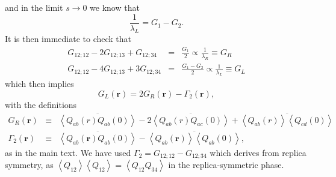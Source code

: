 \documentclass[aps,pnas,float]{revtex4}
\begin{document}
and in the limit $s\to0$ we know that
\begin{equation}
 \frac{1}{\lambda_L} = G_1-G_2.
\end{equation}
It is then immediate to check that
\begin{eqnarray}
 G_{12;12} -2G_{12;13} + G_{12;34} &=& \frac{G_1}{2} \propto \frac{1}{\lambda_R} \equiv G_R\\
 G_{12;12} -4G_{12;13} + 3G_{12;34} &=& \frac{G_1-G_2}{2} \propto \frac{1}{\lambda_L} \equiv G_L
\end{eqnarray}
which then implies
\begin{equation}
 G_L(\boldsymbol{r}) = 2G_R(\boldsymbol{r}) -\Gamma_2(\boldsymbol{r}),
\end{equation}
with the definitions
\begin{eqnarray}
 G_R(\boldsymbol{r}) &\equiv& \overline{{\left<Q_{ab}(r)Q_{ab}(0)\right>}} - 2\overline{{\left<Q_{ab}(r)Q_{ac}(0)\right>}} + \overline{{\left<Q_{ab}(r)\right>\left<Q_{cd}(0)\right>}} \label{eq:defGR}\\
 \Gamma_2(\boldsymbol{r}) &\equiv& \overline{{\left<Q_{ab}(\boldsymbol{r})Q_{ab}(0)\right>}} -\overline{{\left<Q_{ab}(\boldsymbol{r})\right>\left<Q_{ab}(0)\right>}}, \label{eq:defG2}
\end{eqnarray}
as in the main text. We have used $\Gamma_2 = G_{12;12} - G_{12;34}$ which derives from replica symmetry, as $\left<Q_{12}\right>\left<Q_{12}\right> = \left<Q_{12}Q_{34}\right>$ in the replica-symmetric phase.
\end{document}
